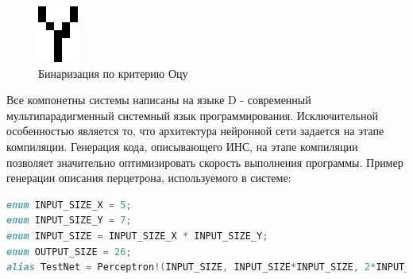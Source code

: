 \documentclass[russian,utf8,emptystyle]{eskdtext}
\begin{document}
\begin{figure}[!htb]
\includegraphics[width=\linewidth]{input-ex-otsu}
\caption{Бинаризация по критерию Оцу}
\endminipage\hfill
\end{figure}

Все компонетны системы написаны на языке D - современный мультипарадигменный системный язык программирования. Исключительной особенностью является то, что архитектура нейронной сети задается на этапе компиляции. Генерация кода, описывающего ИНС, на этапе компиляции позволяет значительно оптимизировать скорость выполнения программы.
\clearpage
Пример генерации описания перцетрона, используемого в системе:
\begin{lstlisting}[language=D]
enum INPUT_SIZE_X = 5;
enum INPUT_SIZE_Y = 7;
enum INPUT_SIZE = INPUT_SIZE_X * INPUT_SIZE_Y;
enum OUTPUT_SIZE = 26;
alias TestNet = Perceptron!(INPUT_SIZE, INPUT_SIZE*INPUT_SIZE, 2*INPUT_SIZE, OUTPUT_SIZE);
\end{lstlisting}
\end{document}
